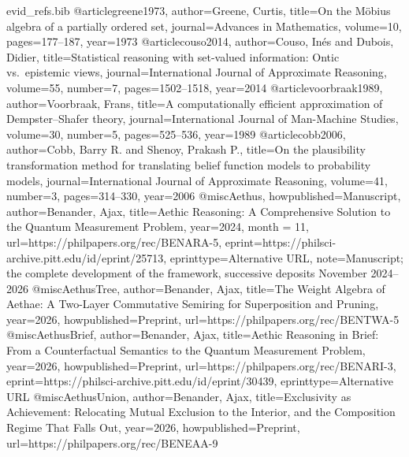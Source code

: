 \begin{filecontents}[overwrite]{evid_refs.bib}
@article{greene1973, author={Greene, Curtis}, title={On the {M}{\"o}bius algebra of a partially ordered set}, journal={Advances in Mathematics}, volume={10}, pages={177--187}, year={1973}}
@article{couso2014, author={Couso, In{\'e}s and Dubois, Didier}, title={Statistical reasoning with set-valued information: Ontic vs.\ epistemic views}, journal={International Journal of Approximate Reasoning}, volume={55}, number={7}, pages={1502--1518}, year={2014}}
@article{voorbraak1989, author={Voorbraak, Frans}, title={A computationally efficient approximation of {Dempster--Shafer} theory}, journal={International Journal of Man-Machine Studies}, volume={30}, number={5}, pages={525--536}, year={1989}}
@article{cobb2006, author={Cobb, Barry R. and Shenoy, Prakash P.}, title={On the plausibility transformation method for translating belief function models to probability models}, journal={International Journal of Approximate Reasoning}, volume={41}, number={3}, pages={314--330}, year={2006}}
@misc{Aethus, howpublished={Manuscript}, author={Benander, Ajax}, title={Aethic Reasoning: A Comprehensive Solution to the Quantum Measurement Problem}, year={2024}, month = {11}, url={https://philpapers.org/rec/BENARA-5}, eprint={https://philsci-archive.pitt.edu/id/eprint/25713}, eprinttype={Alternative URL}, note={Manuscript; the complete development of the framework, successive deposits November 2024--2026}}
@misc{AethusTree, author={Benander, Ajax}, title={The Weight Algebra of Aethae: A Two-Layer Commutative Semiring for Superposition and Pruning}, year={2026}, howpublished={Preprint}, url={https://philpapers.org/rec/BENTWA-5}}
@misc{AethusBrief, author={Benander, Ajax}, title={Aethic Reasoning in Brief: From a Counterfactual Semantics to the Quantum Measurement Problem}, year={2026}, howpublished={Preprint}, url={https://philpapers.org/rec/BENARI-3}, eprint={https://philsci-archive.pitt.edu/id/eprint/30439}, eprinttype={Alternative URL}}
@misc{AethusUnion, author={Benander, Ajax}, title={Exclusivity as Achievement: Relocating Mutual Exclusion to the Interior, and the Composition Regime That Falls Out}, year={2026}, howpublished={Preprint}, url={https://philpapers.org/rec/BENEAA-9}}
\end{filecontents}
\documentclass[11pt]{article}
\usepackage[margin=1.05in]{geometry}
\usepackage{amsmath, amssymb, amsthm}
\usepackage[hidelinks]{hyperref}
\usepackage{microtype}
\usepackage{booktabs}
\usepackage[style=numeric, sorting=none]{biblatex}


\newtheorem{theorem}{Theorem}
\newtheorem{proposition}{Proposition}
\newtheorem{lemma}{Lemma}
\newtheorem{corollary}{Corollary}
\theoremstyle{definition}
\newtheorem{definition}{Definition}
\newtheorem{example}{Example}
\theoremstyle{remark}
\newtheorem{remark}{Remark}
\newcommand{\V}{\mathcal{V}}
\newcommand{\eqV}{\equiv_{\mathbf{V}}}
\newcommand{\eqP}{\equiv_{\mathbf{P}}}
\newcommand{\pl}{\mathrm{pl}}

